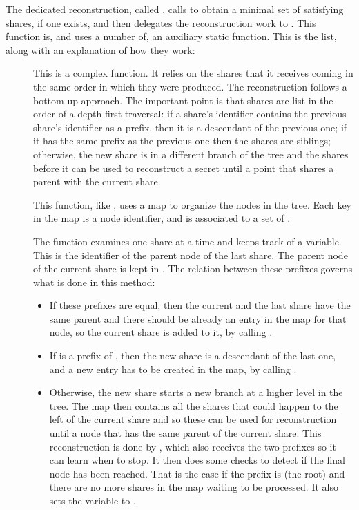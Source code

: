 \documentclass{article}
\begin{document}
The dedicated reconstruction, called , calls  to obtain a minimal set of satisfying shares, if one exists, and then delegates the reconstruction work to .
This function is, and uses a number of, an auxiliary static function. This is the list, along with an explanation of how they work:

\begin{description}
\item[] This is a complex function. It relies on the shares that it receives coming in the same order in which they were produced. The reconstruction follows a bottom-up approach. The important point is that shares are list in the order of a depth first traversal: if a share's identifier contains the previous share's identifier as a prefix, then it is a descendant of the previous one; if it has the same prefix as the previous one then the shares are siblings; otherwise, the new share is in a different branch of the tree and the shares before it can be used to reconstruct a secret until a point that shares a parent with the current share.

This function, like , uses a map to organize the nodes in the tree. Each key in the map is a node identifier, and is associated to a set of \cST. 

The function examines one share at a time and keeps track of a  variable. This is the identifier of the parent node of the last share. The parent node of the current share is kept in . The relation between these prefixes governs what is done in this method:

\begin{itemize}
\item If these prefixes are equal, then the current and the last share have the same parent and there should be already an entry in the map for that node, so the current share is added to it, by calling .
\item If  is a prefix of , then the new share is a descendant of the last one, and a new entry has to be created in the map, by calling .
\item Otherwise, the new share starts a new branch at a higher level in the tree. The map then contains all the shares that could happen to the left of the current share and so these can be used for reconstruction until a node that has the same parent of the current share. This reconstruction is done by , which also receives the two prefixes so it can learn when to stop. It then does some checks to detect if the final node has been reached. That is the case if the prefix is  (the root) and there are no more shares in the map waiting to be processed. It also sets the variable  to .
\end{itemize}


\end{description}
\end{document}
